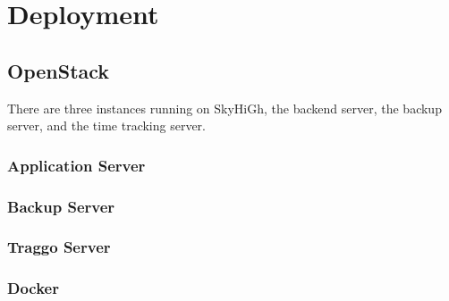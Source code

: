 \chapter{Deployment}
\section{OpenStack}

There are three instances running on SkyHiGh, the backend server, the backup server, and the time tracking server. 

\subsection{Application Server}

\subsection{Backup Server}

\subsection{Traggo Server}

\subsection{Docker}